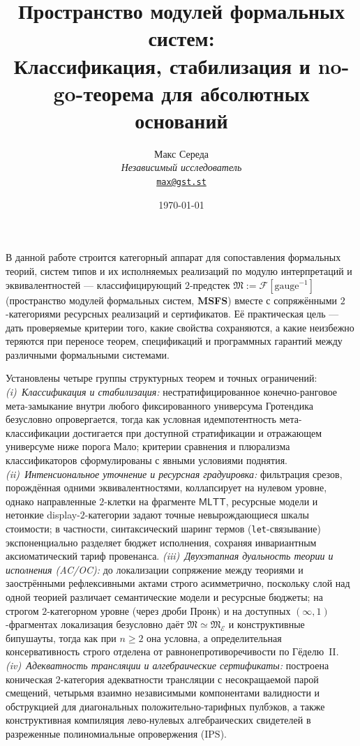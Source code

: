 \documentclass[11pt]{article}
\title{Пространство модулей формальных систем:\\
Классификация, стабилизация и no-go-теорема для абсолютных оснований}
\author{%
  \footnotesize Макс Середа \\[-3pt]
  \scriptsize\textit{Независимый исследователь} \\[-3pt]
  \scriptsize\texttt{\href{mailto:max@gst.st}{max@gst.st}}%
}
\date{\scriptsize\today}
\theoremstyle{plain}
\theoremstyle{definition}
\newcommand{\cF}{\mathcal{F}}
\newcommand{\fM}{\mathfrak{M}}
\newcommand{\MLTT}{\mathsf{MLTT}}
\newcommand{\cE}{\mathcal{E}}
\renewenvironment{abstract}{%
  \small\linespread{0.93}\selectfont
  \begin{center}\bfseries \abstractname\end{center}\vspace{-0.55em}%
  \list{}{\leftmargin=0.30em \rightmargin=0.30em \topsep=0pt \partopsep=0pt \parsep=1.0pt \listparindent=1.2em}%
  \item\relax
}{\endlist}
\begin{document}
\maketitle

\begin{abstract}
В данной работе строится категорный аппарат для сопоставления формальных теорий, систем типов и их исполняемых реализаций по модулю интерпретаций и эквивалентностей --- классифицирующий $2$-предстек $\fM := \cF[\mathrm{gauge}^{-1}]$ (пространство модулей формальных систем, \textbf{MSFS}) вместе с сопряжёнными $2$-категориями ресурсных реализаций и сертификатов. Её практическая цель --- дать проверяемые критерии того, какие свойства сохраняются, а какие неизбежно теряются при переносе теорем, спецификаций и программных гарантий между различными формальными системами.

Установлены четыре группы структурных теорем и точных ограничений:
\emph{(i)~Классификация и стабилизация:} нестратифицированное конечно-ранговое мета-замыкание внутри любого фиксированного универсума Гротендика безусловно опровергается, тогда как условная идемпотентность мета-классификации достигается при доступной стратификации и отражающем универсуме ниже порога Мало; критерии сравнения и плюрализма классификаторов сформулированы с явными условиями поднятия.
\emph{(ii)~Интенсиональное уточнение и ресурсная градуировка:} фильтрация срезов, порождённая одними эквивалентностями, коллапсирует на нулевом уровне, однако направленные $2$-клетки на фрагменте $\MLTT$, ресурсные модели и нетонкие display-$2$-категории задают точные невырождающиеся шкалы стоимости; в частности, синтаксический шаринг термов (\texttt{let}-связывание) экспоненциально разделяет бюджет исполнения, сохраняя инвариантным аксиоматический тариф провенанса.
\emph{(iii)~Двухэтапная дуальность теории и исполнения (AC/OC):} до локализации сопряжение между теориями и заострёнными рефлексивными актами строго асимметрично, поскольку слой над одной теорией различает семантические модели и ресурсные бюджеты; на строгом $2$-категорном уровне (через дроби Пронк) и на доступных $(\infty, 1)$-фрагментах локализация безусловно даёт $\fM \simeq \fM_\cE$ и конструктивные бипушауты, тогда как при $n \ge 2$ она условна, а определительная консервативность строго отделена от равнонепротиворечивости по Гёделю~II.
\emph{(iv)~Адекватность трансляции и алгебраические сертификаты:} построена коническая $2$-категория адекватности трансляции с несокращаемой парой смещений, четырьмя взаимно независимыми компонентами валидности и обструкцией для диагональных положительно-тарифных пулбэков, а также конструктивная компиляция лево-нулевых алгебраических свидетелей в разреженные полиномиальные опровержения ($\mathrm{IPS}$).


\end{abstract}
\end{document}
